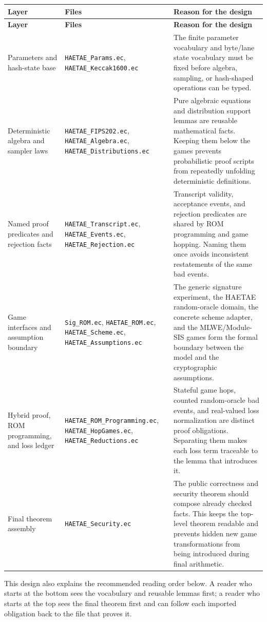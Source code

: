 \documentclass[11pt]{article}
\newcommand{\file}[1]{\nolinkurl{#1}}
\begin{document}
\begin{longtable}{p{}p{}p{}}
\toprule
\textbf{Layer} & \textbf{Files} & \textbf{Reason for the design} \\
\midrule
\endfirsthead
\toprule
\textbf{Layer} & \textbf{Files} & \textbf{Reason for the design} \\
\midrule
\endhead
Parameters and hash-state base &
\file{HAETAE_Params.ec}, \file{HAETAE_Keccak1600.ec} &
The finite parameter vocabulary and byte/lane state vocabulary must be fixed
before algebra, sampling, or hash-shaped operations can be typed. \\
Deterministic algebra and sampler laws &
\file{HAETAE_FIPS202.ec}, \file{HAETAE_Algebra.ec},
\file{HAETAE_Distributions.ec} &
Pure algebraic equations and distribution support lemmas are reusable
mathematical facts.  Keeping them below the games prevents probabilistic proof
scripts from repeatedly unfolding deterministic definitions. \\
Named proof predicates and rejection facts &
\file{HAETAE_Transcript.ec}, \file{HAETAE_Events.ec},
\file{HAETAE_Rejection.ec} &
Transcript validity, acceptance events, and rejection predicates are shared by
ROM programming and game hopping.  Naming them once avoids inconsistent
restatements of the same bad events. \\
Game interfaces and assumption boundary &
\file{Sig_ROM.ec}, \file{HAETAE_ROM.ec}, \file{HAETAE_Scheme.ec},
\file{HAETAE_Assumptions.ec} &
The generic signature experiment, the HAETAE random-oracle domain, the concrete
scheme adapter, and the MLWE/Module-SIS games form the formal boundary between
the model and the cryptographic assumptions. \\
Hybrid proof, ROM programming, and loss ledger &
\file{HAETAE_ROM_Programming.ec}, \file{HAETAE_HopGames.ec},
\file{HAETAE_Reductions.ec} &
Stateful game hops, counted random-oracle bad events, and real-valued loss
normalization are distinct proof obligations.  Separating them makes each loss
term traceable to the lemma that introduces it. \\
Final theorem assembly &
\file{HAETAE_Security.ec} &
The public correctness and security theorem should compose already checked
facts.  This keeps the top-level theorem readable and prevents hidden new game
transformations from being introduced during final arithmetic. \\
\bottomrule
\end{longtable}

This design also explains the recommended reading order below.  A reader who
starts at the bottom sees the vocabulary and reusable lemmas first; a reader
who starts at the top sees the final theorem first and can follow each imported
obligation back to the file that proves it.
\end{document}
